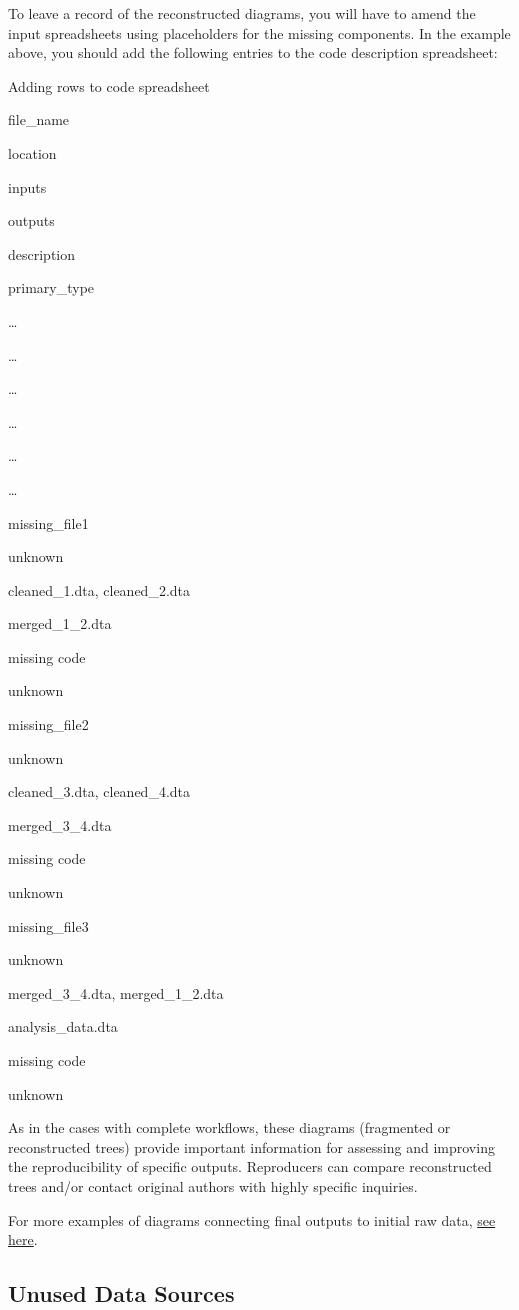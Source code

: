 \documentclass[]{book}
\begin{document}
To leave a record of the reconstructed diagrams, you will have to amend the input spreadsheets using placeholders for the missing components. In the example above, you should add the following entries to the code description spreadsheet:

\label{tab:adding-rows}Adding rows to code spreadsheet

file\_name

location

inputs

outputs

description

primary\_type

\ldots{}

\ldots{}

\ldots{}

\ldots{}

\ldots{}

\ldots{}

missing\_file1

unknown

cleaned\_1.dta, cleaned\_2.dta

merged\_1\_2.dta

missing code

unknown

missing\_file2

unknown

cleaned\_3.dta, cleaned\_4.dta

merged\_3\_4.dta

missing code

unknown

missing\_file3

unknown

merged\_3\_4.dta, merged\_1\_2.dta

analysis\_data.dta

missing code

unknown

As in the cases with complete workflows, these diagrams (fragmented or reconstructed trees) provide important information for assessing and improving the reproducibility of specific outputs. Reproducers can compare reconstructed trees and/or contact original authors with highly specific inquiries.

For more examples of diagrams connecting final outputs to initial raw data, \protect\hyperlink{examples-of-reproduction-trees}{see here}.

\hypertarget{unused-data-sources}{%
\subsection{Unused Data Sources}\label{unused-data-sources}}
\end{document}

